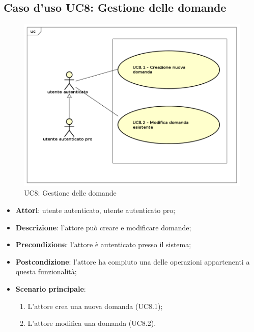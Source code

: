 \subsection{Caso d'uso UC8: Gestione delle domande}
	\label{UC8}
	\begin{figure}[h]
		\centering
			\includegraphics[scale=0.45,keepaspectratio]{UML/UC8.png}
		\caption{UC8: Gestione delle domande}
	\end{figure}
	\FloatBarrier
	\begin{itemize}
		\item
			\textbf{Attori}: utente autenticato, utente autenticato pro;
		\item		
			\textbf{Descrizione}: l'attore può creare e modificare domande;
		\item
			\textbf{Precondizione}: l'attore è autenticato presso il sistema; 
		\item
			\textbf{Postcondizione}: l'attore ha compiuto una delle operazioni appartenenti a questa funzionalità;
		\item
			\textbf{Scenario principale}:
	       		\begin{enumerate}
					\item
					L'attore crea una nuova domanda (UC8.1);
					\item
					L'attore modifica una domanda (UC8.2).
	 			\end{enumerate}
	\end{itemize}
